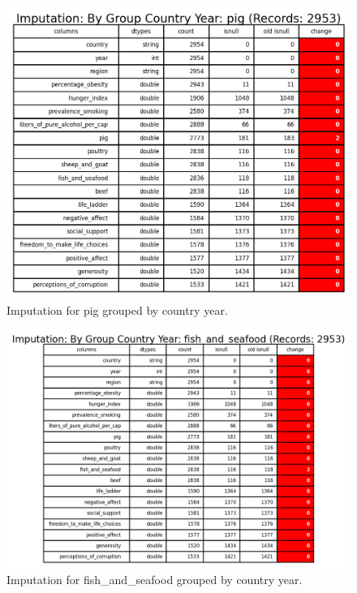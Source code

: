                 \begin{figure}[H]
                        \centering
                        \includegraphics[scale=1]{images/dp_imputation_c_y_pig}
                        \caption{Imputation for pig grouped by country year.}
                        \label{fig:dp-impute-group-pig}
                \end{figure}

                \begin{figure}[H]
                        \centering
                        \includegraphics[scale=1]{images/dp_imputation_c_y_fish_and_seafood}
                        \caption{Imputation for fish\_and\_seafood grouped by country year.}
                        \label{fig:dp-impute-group-fish-seafood}
                \end{figure}


